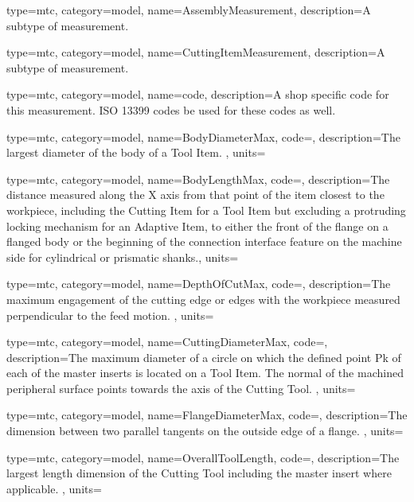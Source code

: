 {
  type=mtc,
  category=model,
  name={AssemblyMeasurement},
  description={A subtype of \gls{measurement}.}
}


{
  type=mtc,
  category=model,
  name={CuttingItemMeasurement},
  description={A subtype of \gls{measurement}.}
}


{
  type=mtc,
  category=model,
  name={code},
  description={A shop specific code for this measurement. ISO 13399 codes \MAY be used for these codes as well.}
}



{
  type=mtc,
  category=model,
  name={BodyDiameterMax},
  code=,
  description={The largest diameter of the body of a Tool Item. },
  units=
}


{
  type=mtc,
  category=model,
  name={BodyLengthMax},
  code=,
  description={The distance measured along the X axis from that point of the item closest to the workpiece, including the Cutting Item for a Tool Item but excluding a protruding locking mechanism for an Adaptive Item, to either the front of the flange on a flanged body or the beginning of the connection interface feature on the machine side for cylindrical or prismatic shanks.},
  units=
}


{
  type=mtc,
  category=model,
  name={DepthOfCutMax},
  code=,
  description={The maximum engagement of the cutting edge or edges with the workpiece measured perpendicular to the feed motion. },
  units=
}


{
  type=mtc,
  category=model,
  name={CuttingDiameterMax},
  code=,
  description={The maximum diameter of a circle on which the defined point Pk of each of the master inserts is located on a Tool Item. The normal of the machined peripheral surface points towards the axis of the Cutting Tool. },
  units=
}


{
  type=mtc,
  category=model,
  name={FlangeDiameterMax},
  code=,
  description={The dimension between two parallel tangents on the outside edge of a flange. },
  units=
}


{
  type=mtc,
  category=model,
  name={OverallToolLength},
  code=,
  description={The largest length dimension of the Cutting Tool including the master insert where applicable.  },
  units=
}


